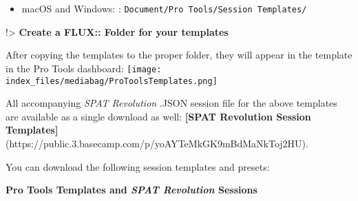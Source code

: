 \documentclass[
  letterpaper,
  DIV=11,
  numbers=noendperiod]{scrreport}
\providecommand{\tightlist}{%
  \setlength{\itemsep}{0pt}\setlength{\parskip}{0pt}}\usepackage{longtable,booktabs,array}
\begin{document}
\begin{itemize}
\tightlist
\item
  macOS and Windows: : \texttt{Document/Pro\ Tools/Session\ Templates/}
\end{itemize}

!\textgreater{} \textbf{Create a FLUX:: Folder for your templates}

After copying the templates to the proper folder, they will appear in
the template in the Pro Tools dashboard:
\texttt{[image: index\_files/mediabag/ProToolsTemplates.png]}

All accompanying \emph{SPAT Revolution} .JSON session file for the above
templates are available as a single download as well: \textbf{{[}SPAT
Revolution Session
Templates{]}}(https://public.3.basecamp.com/p/yoAYTeMkGK9mBdMaNkToj2HU).

You can download the following session templates and presets:

\textbf{Pro Tools Templates and \emph{SPAT Revolution} Sessions}
\end{document}
